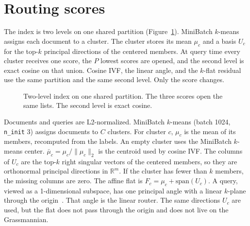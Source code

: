 \documentclass[sigconf,nonacm]{acmart}
\begin{document}
\section{Routing scores}
\label{sec:method}

The index is two levels on one shared partition (Figure~\ref{fig:pipeline}). MiniBatch $k$-means assigns each document to a cluster. The cluster stores its mean $\mu_c$ and a basis $U_c$ for the top-$k$ principal directions of the centered members. At query time every cluster receives one score, the $P$ lowest scores are opened, and the second level is exact cosine on that union. Cosine IVF, the linear angle, and the $k$-flat residual use the same partition and the same second level. Only the score changes.

\begin{figure}[t]
\centering
{}
\caption{Two-level index on one shared partition. The three scores open the same lists. The second level is exact cosine.}
\label{fig:pipeline}
\end{figure}

Documents and queries are L2-normalized. MiniBatch $k$-means (batch 1024, \texttt{n\_init} 3) assigns documents to $C$ clusters. For cluster $c$, $\mu_c$ is the mean of its members, recomputed from the labels. An empty cluster uses the MiniBatch $k$-means center. $\bar\mu_c = \mu_c/\|\mu_c\|_2$ is the centroid used by cosine IVF. The columns of $U_c$ are the top-$k$ right singular vectors of the centered members, so they are orthonormal principal directions in $\mathbb{R}^m$. If the cluster has fewer than $k$ members, the missing columns are zero. The affine flat is $F_c = \mu_c + \mathrm{span}(U_c)$. A query, viewed as a 1-dimensional subspace, has one principal angle with a linear $k$-plane through the origin~\cite{edelman1998grassmannian}. That angle is the linear router. The same directions $U_c$ are used, but the flat does not pass through the origin and does not live on the Grassmannian.
\end{document}
